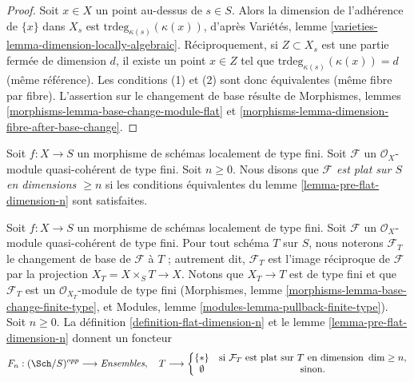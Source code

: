 \begin{proof}
Soit $x \in X$ un point au-dessus de $s \in S$.
Alors la dimension de l'adhérence de $\{x\}$ dans $X_s$
est $\text{trdeg}_{\kappa(s)}(\kappa(x))$, d'après
Variétés, lemme \ref{varieties-lemma-dimension-locally-algebraic}.
Réciproquement, si $Z \subset X_s$ est une partie fermée
de dimension $d$, il existe un point $x \in Z$
tel que $\text{trdeg}_{\kappa(s)}(\kappa(x)) = d$ (même référence).
Les conditions (1) et (2) sont donc équivalentes (même fibre par fibre).
L'assertion sur le changement de base résulte de
Morphismes, lemmes \ref{morphisms-lemma-base-change-module-flat} et
\ref{morphisms-lemma-dimension-fibre-after-base-change}.
\end{proof}

\begin{definition}
\label{definition-flat-dimension-n}
Soit $f : X \to S$ un morphisme de schémas localement de type fini.
Soit $\mathcal{F}$ un $\mathcal{O}_X$-module quasi-cohérent de type fini.
Soit $n \geq 0$.
Nous disons que {\it $\mathcal{F}$ est plat sur $S$ en dimensions $\geq n$}
si les conditions équivalentes du lemme \ref{lemma-pre-flat-dimension-n}
sont satisfaites.
\end{definition}

\begin{situation}
\label{situation-flat-dimension-n}
Soit $f : X \to S$ un morphisme de schémas localement de type fini.
Soit $\mathcal{F}$ un $\mathcal{O}_X$-module quasi-cohérent de type
fini. Pour tout schéma $T$ sur $S$, nous noterons $\mathcal{F}_T$ le
changement de base de $\mathcal{F}$ à $T$ ; autrement dit, $\mathcal{F}_T$
est l'image réciproque de $\mathcal{F}$ par la projection
$X_T = X \times_S T \to X$. Notons que $X_T \to T$ est de type fini
et que $\mathcal{F}_T$ est un $\mathcal{O}_{X_T}$-module
de type fini (Morphismes, lemme
\ref{morphisms-lemma-base-change-finite-type}, et
Modules, lemme \ref{modules-lemma-pullback-finite-type}).
Soit $n \geq 0$. La définition \ref{definition-flat-dimension-n} et le
lemme \ref{lemma-pre-flat-dimension-n} donnent un foncteur
\begin{equation}
\label{equation-flat-dimension-n}
F_n : (\Sch/S)^{opp} \longrightarrow \textit{Ensembles}, \quad
T \longrightarrow \left\{
\begin{matrix}
\{*\} & \text{si }\mathcal{F}_T\text{ est plat sur }T\text{ en dimension }\dim \geq n, \\
\emptyset & \text{sinon.}
\end{matrix}
\right.
\end{equation}
\end{situation}

